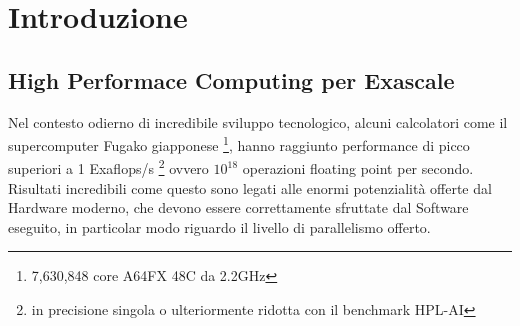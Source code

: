 \chapter{Introduzione}
\label{ChIntro}

\section{High Performace Computing per Exascale}
Nel contesto odierno di incredibile sviluppo tecnologico, alcuni calcolatori 
come il supercomputer Fugako giapponese \footnote{7,630,848 core A64FX 48C da 2.2GHz},
hanno raggiunto performance di picco superiori a 1 Exaflops/s 
\footnote{in precisione singola o ulteriormente ridotta con il benchmark HPL-AI}
 ovvero $10^{18}$ operazioni floating point per secondo.\\
\voidLine
Risultati incredibili come questo sono legati alle enormi potenzialità offerte dal Hardware moderno,
che devono essere correttamente sfruttate dal Software eseguito, 
in particolar modo riguardo il livello di parallelismo offerto.\\

